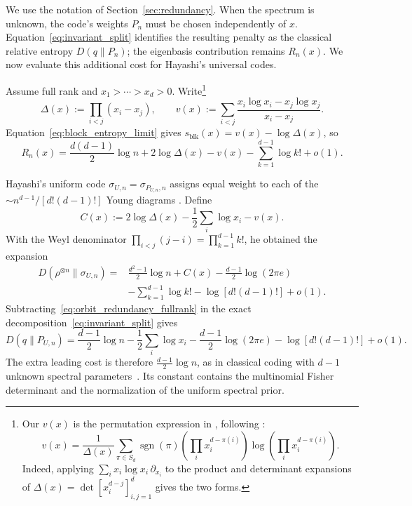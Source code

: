 \documentclass[a4paper,onecolumn,11pt]{quantumarticle}
\begin{document}
We use the notation of Section~\ref{sec:redundancy}. When the spectrum is unknown, the code's weights $P_n$ must be
chosen independently of $x$. Equation~\eqref{eq:invariant_split}
identifies the resulting penalty as the classical relative
entropy $D(q\|P_n)$; the eigenbasis contribution remains
$R_n(x)$. We now evaluate this additional cost for Hayashi's
universal codes.

Assume full rank and $x_1>\cdots>x_d>0$. Write\footnote{Our
$v(x)$ is the permutation expression in
\cite[Eq.~(10)]{hayashi2010universal}, following
\cite{matsumoto2007universal}:
\[
v(x)=\frac{1}{\Delta(x)}
\sum_{\pi\in S_d}\operatorname{sgn}(\pi)
\left(\prod_i x_i^{d-\pi(i)}\right)
\log\left(\prod_i x_i^{d-\pi(i)}\right).
\]
Indeed, applying $\sum_i x_i\log x_i\,\partial_{x_i}$ to the product
and determinant expansions of
$\Delta(x)=\det[x_i^{d-j}]_{i,j=1}^d$ gives the two forms.}
\[
\Delta(x):=\prod_{i<j}(x_i-x_j),\qquad
v(x):=\sum_{i<j}\frac{x_i\log x_i-x_j\log x_j}{x_i-x_j}.
\]
Equation~\eqref{eq:block_entropy_limit} gives
$s_{\mathrm{blk}}(x)=v(x)-\log\Delta(x)$, so
\begin{equation}\label{eq:orbit_redundancy_fullrank}
R_n(x)=\frac{d(d-1)}2\log n+2\log\Delta(x)-v(x)
-\sum_{k=1}^{d-1}\log k!+o(1).
\end{equation}

Hayashi's uniform code $\sigma_{U,n}=\sigma_{P_{U,n},n}$ assigns equal
weight to each of the $\sim n^{d-1}/[d!(d-1)!]$ Young diagrams
\cite{hayashi2010universal}. Define
\begin{equation}\label{eq:hayashi_C}
C(x):=2\log\Delta(x)-\frac12\sum_i\log x_i-v(x).
\end{equation}
With the Weyl denominator
$\prod_{i<j}(j-i)=\prod_{k=1}^{d-1}k!$, he obtained the expansion
\begin{align}\label{eq:hayashi_pointwise}
D(\rho^{\otimes n}\|\sigma_{U,n})
={}&\frac{d^2-1}{2}\log n+C(x)-\frac{d-1}{2}\log(2\pi e)\nonumber\\
&-\sum_{k=1}^{d-1}\log k!-\log[d!(d-1)!]+o(1).
\end{align}
Subtracting~\eqref{eq:orbit_redundancy_fullrank} in the exact
decomposition~\eqref{eq:invariant_split} gives
\begin{equation}\label{eq:spectral_redundancy_uniform}
D(q\|P_{U,n})
=\frac{d-1}{2}\log n-\frac12\sum_i\log x_i
-\frac{d-1}{2}\log(2\pi e)-\log[d!(d-1)!]+o(1).
\end{equation}
The extra leading cost is therefore $\frac{d-1}{2}\log n$, as in
classical coding with $d-1$ unknown spectral
parameters~\cite{clarke1990information}. Its constant contains
the multinomial Fisher determinant and the normalization of the
uniform spectral prior.
\end{document}
